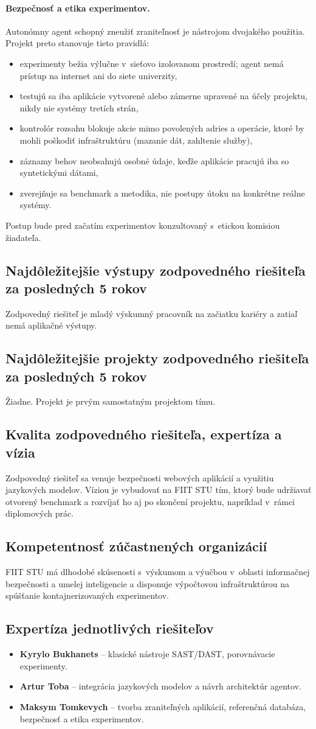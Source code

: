 \documentclass[11pt,a4paper]{article}
\newcommand{\bod}[1]{\subsection*{#1}}
\begin{document}
\paragraph{Bezpečnosť a etika experimentov.} Autonómny agent schopný zneužiť zraniteľnosť je nástrojom dvojakého použitia. Projekt preto stanovuje tieto pravidlá:
\begin{itemize}
  \item experimenty bežia výlučne v~sieťovo izolovanom prostredí; agent nemá prístup na internet ani do siete univerzity,
  \item testujú sa iba aplikácie vytvorené alebo zámerne upravené na účely projektu, nikdy nie systémy tretích strán,
  \item kontrolór rozsahu blokuje akcie mimo povolených adries a operácie, ktoré by mohli poškodiť infraštruktúru (mazanie dát, zahltenie služby),
  \item záznamy behov neobsahujú osobné údaje, keďže aplikácie pracujú iba so syntetickými dátami,
  \item zverejňuje sa benchmark a metodika, nie postupy útoku na konkrétne reálne systémy.
\end{itemize}
Postup bude pred začatím experimentov konzultovaný s~etickou komisiou žiadateľa.

\bod{Najdôležitejšie výstupy zodpovedného riešiteľa za posledných 5 rokov}
Zodpovedný riešiteľ je mladý výskumný pracovník na začiatku kariéry a zatiaľ nemá aplikačné výstupy.

\bod{Najdôležitejšie projekty zodpovedného riešiteľa za posledných 5 rokov}
Žiadne. Projekt je prvým samostatným projektom tímu.

\bod{Kvalita zodpovedného riešiteľa, expertíza a vízia}
Zodpovedný riešiteľ sa venuje bezpečnosti webových aplikácií a využitiu jazykových modelov. Víziou je vybudovať na FIIT STU tím, ktorý bude udržiavať otvorený benchmark a rozvíjať ho aj po skončení projektu, napríklad v~rámci diplomových prác.

\bod{Kompetentnosť zúčastnených organizácií}
FIIT STU má dlhodobé skúsenosti s~výskumom a výučbou v~oblasti informačnej bezpečnosti a umelej inteligencie a disponuje výpočtovou infraštruktúrou na spúšťanie kontajnerizovaných experimentov.

\bod{Expertíza jednotlivých riešiteľov}
\begin{itemize}
  \item \textbf{Kyrylo Bukhanets} -- klasické nástroje SAST/DAST, porovnávacie experimenty.
  \item \textbf{Artur Toba} -- integrácia jazykových modelov a návrh architektúr agentov.
  \item \textbf{Maksym Tomkevych} -- tvorba zraniteľných aplikácií, referenčná databáza, bezpečnosť a etika experimentov.
\end{itemize}
\end{document}
